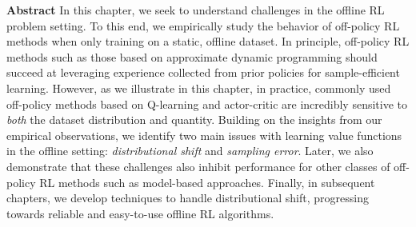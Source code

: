 \documentclass[../thesis.tex]{subfiles}
\begin{document}

% 

% 
% 
% 
% 
% 
% 


\vspace{-0.4cm}
\begin{AIbox}{\large{\textbf{Abstract}}}
\vspace{4mm}
In this chapter, we seek to understand challenges in the offline RL problem setting. To this end, we empirically study the behavior of off-policy RL methods when only training on a static, offline dataset. In principle, off-policy RL methods such as those based on approximate dynamic programming should succeed at leveraging experience collected from prior policies for sample-efficient learning. However, as we illustrate in this chapter, in practice, commonly used off-policy methods based on Q-learning and actor-critic are incredibly sensitive to \emph{both} the dataset distribution and quantity. Building on the insights from our empirical observations, we identify two main issues with learning value functions in the offline setting: \emph{distributional shift} and \emph{sampling error}. Later, we also demonstrate that these challenges also inhibit performance for other classes of off-policy RL methods such as model-based approaches. Finally, in subsequent chapters, we develop techniques to handle distributional shift, progressing towards reliable and easy-to-use offline RL algorithms.  
\vspace{2mm}
\end{AIbox}
    
\end{document}
